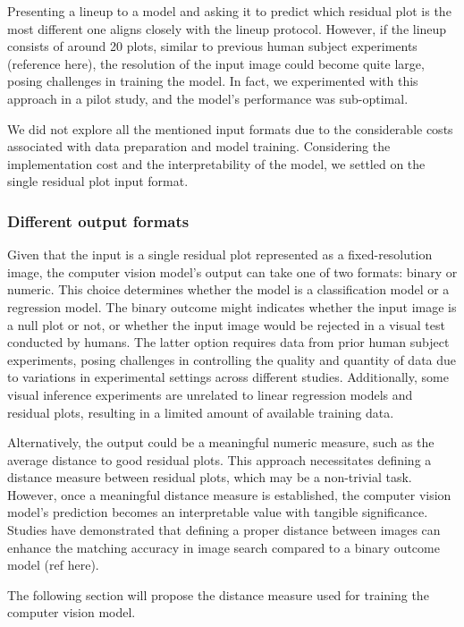 \documentclass[]{interact}
\theoremstyle{plain}%
\theoremstyle{definition}
\theoremstyle{remark}
\begin{document}
Presenting a lineup to a model and asking it to predict which residual
plot is the most different one aligns closely with the lineup protocol.
However, if the lineup consists of around 20 plots, similar to previous
human subject experiments (reference here), the resolution of the input
image could become quite large, posing challenges in training the model.
In fact, we experimented with this approach in a pilot study, and the
model's performance was sub-optimal.

We did not explore all the mentioned input formats due to the
considerable costs associated with data preparation and model training.
Considering the implementation cost and the interpretability of the
model, we settled on the single residual plot input format.

\hypertarget{different-output-formats}{%
\subsubsection{Different output
formats}\label{different-output-formats}}

Given that the input is a single residual plot represented as a
fixed-resolution image, the computer vision model's output can take one
of two formats: binary or numeric. This choice determines whether the
model is a classification model or a regression model. The binary
outcome might indicates whether the input image is a null plot or not,
or whether the input image would be rejected in a visual test conducted
by humans. The latter option requires data from prior human subject
experiments, posing challenges in controlling the quality and quantity
of data due to variations in experimental settings across different
studies. Additionally, some visual inference experiments are unrelated
to linear regression models and residual plots, resulting in a limited
amount of available training data.

Alternatively, the output could be a meaningful numeric measure, such as
the average distance to good residual plots. This approach necessitates
defining a distance measure between residual plots, which may be a
non-trivial task. However, once a meaningful distance measure is
established, the computer vision model's prediction becomes an
interpretable value with tangible significance. Studies have
demonstrated that defining a proper distance between images can enhance
the matching accuracy in image search compared to a binary outcome model
(ref here).

The following section will propose the distance measure used for
training the computer vision model.
\end{document}
